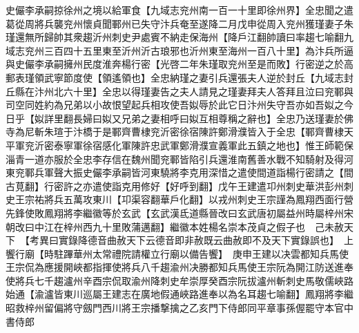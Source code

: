 史儼李承嗣掠徐州之境以給軍食【九域志兖州南一百一十里即徐州界】全忠聞之遣葛從周將兵襲兖州懷貞聞鄆州已失守汴兵奄至遂降二月戊申從周入兖州獲瑾妻子朱瑾還無所歸帥其衆趨沂州刺史尹處賓不納走保海州【降戶江翻帥讀曰率趨七喻翻九域志兖州三百四十五里東至沂州沂古琅邪也沂州東至海州一百八十里】為汴兵所逼與史儼李承嗣擁州民度淮奔楊行密【光啓二年朱瑾取兖州至是而敗】行密逆之於高郵表瑾領武寧節度使【領遙領也】全忠納瑾之妻引兵還張夫人逆於封丘【九域志封丘縣在汴州北六十里】全忠以得瑾妻告之夫人請見之瑾妻拜夫人答拜且泣曰兖鄆與司空同姓約為兄弟以小故恨望起兵相攻使吾姒辱於此它日汴州失守吾亦如吾姒之今日乎【姒詳里翻長婦曰姒又兄弟之妻相呼曰姒互相尊稱之辭也】全忠乃送瑾妻於佛寺為尼斬朱瑄于汴橋于是鄆齊曹棣兖沂密徐宿陳許鄭滑濮皆入于全忠【鄆齊曹棣天平軍兖沂密泰寧軍徐宿感化軍陳許忠武軍鄭滑濮宣義軍此五鎮之地也】惟王師範保淄青一道亦服於全忠李存信在魏州聞兖鄆皆陷引兵還淮南舊善水戰不知騎射及得河東兖鄆兵軍聲大振史儼李承嗣皆河東驍將李克用深惜之遣使間道詣楊行密請之【間古莧翻】行密許之亦遣使詣克用修好【好呼到翻】戊午王建遣卭州刺史華洪彭州刺史王宗祐將兵五萬攻東川【卭渠容翻華戶化翻】以戎州刺史王宗謹為鳳翔西面行營先鋒使敗鳳翔將李繼徽等於玄武【玄武漢氐道縣晉改曰玄武唐初屬益州時屬梓州宋朝改曰中江在梓州西九十里敗蒲邁翻】繼徽本姓楊名崇本茂貞之假子也　己未赦天下　【考異曰實錄降德音曲赦天下云德音即非赦既云曲赦即不及天下實錄誤也】　上饗行廟【時駐蹕華州太常禮院請權立行廟以備告饗】　庚申王建以决雲都知兵馬使王宗侃為應援開峽都指揮使將兵八千趨渝州决勝都知兵馬使王宗阮為開江防送進奉使將兵七千趨瀘州辛酉宗侃取渝州降刺史牟崇厚癸酉宗阮拔瀘州斬刺史馬敬儒峽路始通【渝瀘皆東川巡屬王建志在廣地假通峽路進奉以為名耳趨七喻翻】鳳翔將李繼昭救梓州留偏將守劔門西川將王宗播撃擒之乙亥門下侍郎同平章事孫偓罷守本官中書侍郎


